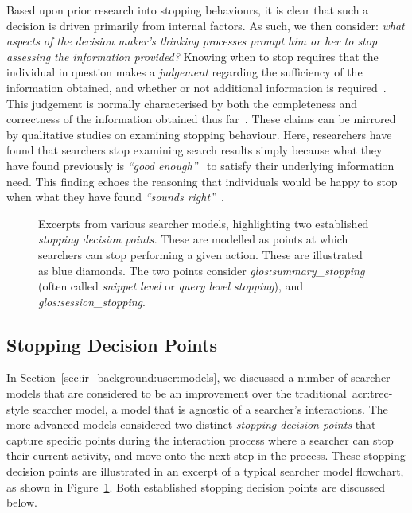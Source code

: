 Based upon prior research into stopping behaviours, it is clear that such a decision is driven primarily from internal factors. As such, we then consider: \emph{what aspects of the decision maker's thinking processes prompt him or her to stop assessing the information provided?} Knowing when to stop requires that the individual in question makes a \emph{judgement} regarding the sufficiency of the information obtained, and whether or not additional information is required~\citep{browne2004stopping_rules}. This judgement is normally characterised by both the completeness and correctness of the information obtained thus far~\citep{smith1991belief}. These claims can be mirrored by qualitative studies on examining stopping behaviour. Here, researchers have found that searchers stop examining search results simply because what they have found previously is \emph{``good enough''}~\citep{zach2005enough_is_enough} to satisfy their underlying information need. This finding echoes the reasoning that individuals would be happy to stop when what they have found \emph{``sounds right''}~\citep{perkins1983difficulties}.

\begin{figure}[t!]
    \centering
    \caption[Two established \emph{stopping decision points}]{Excerpts from various searcher models, highlighting two established \emph{stopping decision points.} These are modelled as points at which searchers can stop performing a given action. These are illustrated as blue diamonds. The two points consider  \emph{\gls{glos:summary_stopping}} (often called \emph{snippet level} or \emph{query level stopping}), and  \emph{\gls{glos:session_stopping}}.}
    \label{fig:model_two_points}
\end{figure}

\subsection{Stopping Decision Points}\label{sec:stopping_background:why:points}
In Section~\ref{sec:ir_background:user:models}, we discussed a number of searcher models that are considered to be an improvement over the traditional~\gls{acr:trec}-style searcher model, a model that is agnostic of a searcher's interactions. The more advanced models considered two distinct \emph{stopping decision points} that capture specific points during the interaction process where a searcher can stop their current activity, and move onto the next step in the process. These stopping decision points are illustrated in an excerpt of a typical searcher model flowchart, as shown in Figure~\ref{fig:model_two_points}. Both established stopping decision points are discussed below.

